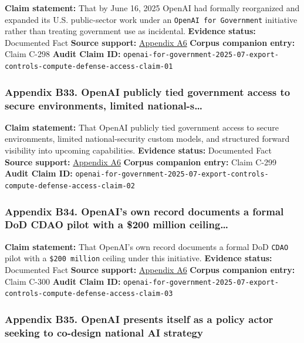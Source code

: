 \documentclass[
  american,
  11pt,
  letterpaper,
]{article}
\begin{document}
\textbf{Claim statement:} That by June 16, 2025 OpenAI had formally
reorganized and expanded its U.S. public-sector work under an
\texttt{OpenAI\ for\ Government} initiative rather than treating
government use as incidental. \textbf{Evidence status:} Documented Fact
\textbf{Source support:}
\hyperref[ch-07-appendix-a6-introducing-openai-for-government]{Appendix
A6} \textbf{Corpus companion entry:} Claim C-298 \textbf{Audit Claim
ID:}
\texttt{openai-for-government-2025-07-export-controls-compute-defense-access-claim-01}

\subsubsection{Appendix B33. OpenAI publicly tied government access to
secure environments, limited
national-s\ldots{}}\label{ch-07-appendix-b33-openai-publicly-tied-government-access-to-secure-environments-limited-national-s}

\textbf{Claim statement:} That OpenAI publicly tied government access to
secure environments, limited national-security custom models, and
structured forward visibility into upcoming capabilities.
\textbf{Evidence status:} Documented Fact \textbf{Source support:}
\hyperref[ch-07-appendix-a6-introducing-openai-for-government]{Appendix
A6} \textbf{Corpus companion entry:} Claim C-299 \textbf{Audit Claim
ID:}
\texttt{openai-for-government-2025-07-export-controls-compute-defense-access-claim-02}

\subsubsection{Appendix B34. OpenAI's own record documents a formal DoD
CDAO pilot with a \$200 million
ceiling\ldots{}}\label{ch-07-appendix-b34-openai-s-own-record-documents-a-formal-dod-cdao-pilot-with-a-200-million-ceiling}

\textbf{Claim statement:} That OpenAI's own record documents a formal
DoD \texttt{CDAO} pilot with a \texttt{\$200\ million} ceiling under
this initiative. \textbf{Evidence status:} Documented Fact
\textbf{Source support:}
\hyperref[ch-07-appendix-a6-introducing-openai-for-government]{Appendix
A6} \textbf{Corpus companion entry:} Claim C-300 \textbf{Audit Claim
ID:}
\texttt{openai-for-government-2025-07-export-controls-compute-defense-access-claim-03}

\subsubsection{Appendix B35. OpenAI presents itself as a policy actor
seeking to co-design national AI
strategy}\label{ch-07-appendix-b35-openai-presents-itself-as-a-policy-actor-seeking-to-co-design-national-ai-strategy}
\end{document}
